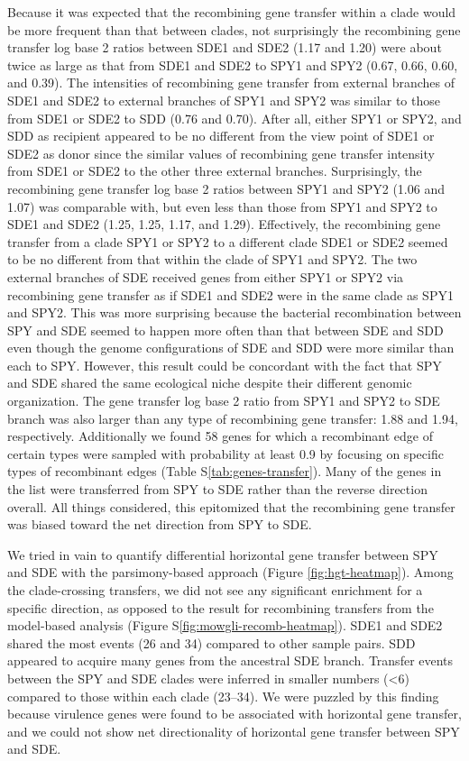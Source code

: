 \documentclass[english]{article}
\begin{document}
Because it was expected that the recombining gene transfer within a clade would
be more frequent than that between clades, not surprisingly the recombining gene
transfer log base 2 ratios between SDE1 and SDE2 (1.17 and 1.20) were about
twice as large as that from SDE1 and SDE2 to SPY1 and SPY2 (0.67, 0.66, 0.60,
and 0.39).  The intensities of recombining gene transfer from external branches
of SDE1 and SDE2 to external branches of SPY1 and SPY2 was similar to those from
SDE1 or SDE2 to SDD (0.76 and 0.70).  After all, either SPY1 or SPY2, and SDD as
recipient appeared to be no different from the view point of SDE1 or SDE2 as
donor since the similar values of recombining gene transfer intensity from SDE1
or SDE2 to the other three external branches.  Surprisingly, the recombining
gene transfer log base 2 ratios between SPY1 and SPY2 (1.06 and 1.07) was
comparable with, but even less than those from SPY1 and SPY2 to SDE1 and SDE2
(1.25, 1.25, 1.17, and 1.29).  Effectively, the recombining gene transfer from a
clade SPY1 or SPY2 to a different clade SDE1 or SDE2 seemed to be no different
from that within the clade of SPY1 and SPY2.  The two external branches of SDE
received genes from either SPY1 or SPY2 via recombining gene transfer as if SDE1
and SDE2 were in the same clade as SPY1 and SPY2.  This was more surprising
because the bacterial recombination between SPY and SDE seemed to happen more
often than that between SDE and SDD even though the genome configurations of SDE
and SDD were more similar than each to SPY.  However, this result could be
concordant with the fact that SPY and SDE shared the same ecological niche
despite their different genomic organization.  The gene transfer log base 2
ratio from SPY1 and SPY2 to SDE branch was also larger than any type of
recombining gene transfer: 1.88 and 1.94, respectively.  Additionally we found
58 genes for which a recombinant edge of certain types were sampled with
probability at least 0.9 by focusing on specific types of recombinant edges
(Table S\ref{tab:genes-transfer}).  Many of the genes in the list were
transferred from SPY to SDE rather than the reverse direction overall.  All
things considered, this epitomized that the recombining gene transfer was biased
toward the net direction from SPY to SDE.  

We tried in vain to quantify differential horizontal gene transfer between SPY
and SDE with the parsimony-based approach (Figure \ref{fig:hgt-heatmap}).  Among
the clade-crossing transfers, we did not see any significant enrichment for a
specific direction, as opposed to the result for recombining transfers from the
model-based analysis (Figure S\ref{fig:mowgli-recomb-heatmap}).  SDE1 and SDE2
shared the most events (26 and 34) compared to other sample pairs.  SDD appeared
to acquire many genes from the ancestral SDE branch.  Transfer events between
the SPY and SDE clades were inferred in smaller numbers (<6) compared to those
within each clade (23--34). We were puzzled by this finding because virulence
genes were found to be associated with horizontal gene transfer, and we could
not show net directionality of horizontal gene transfer between SPY and SDE.
\end{document}
